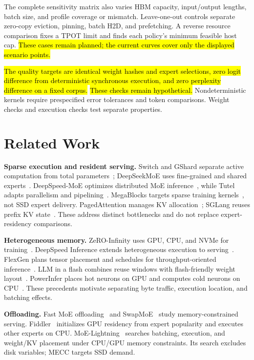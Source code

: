 \documentclass[conference,9pt,letterpaper]{IEEEtran}
\newcommand{\draftnote}[1]{{\sethlcolor{DraftYellow}\hl{#1}}}
\newcommand{\mecc}{\textsc{MECC}}
\begin{document}
The complete sensitivity matrix also varies HBM capacity, input/output lengths, batch size, and profile coverage or mismatch. Leave-one-out controls separate zero-copy eviction, pinning, batch H2D, and prefetching. A reverse resource comparison fixes a TPOT limit and finds each policy's minimum feasible host cap. \draftnote{These cases remain planned; the current curves cover only the displayed scenario points.}

\draftnote{The quality targets are identical weight hashes and expert selections, zero logit difference from deterministic synchronous execution, and zero perplexity difference on a fixed corpus.} \draftnote{These checks remain hypothetical.} Nondeterministic kernels require prespecified error tolerances and token comparisons. Weight checks and execution checks test separate properties.

\balance
\section{Related Work}
\textbf{Sparse execution and resident serving.} Switch and GShard separate active computation from total parameters~\cite{switch,gshard}; DeepSeekMoE uses fine-grained and shared experts~\cite{deepseekmoe}. DeepSpeed-MoE optimizes distributed MoE inference~\cite{deepspeedmoe}, while Tutel adapts parallelism and pipelining~\cite{tutel}. MegaBlocks targets sparse training kernels~\cite{megablocks}, not SSD expert delivery. PagedAttention manages KV allocation~\cite{pagedattention}; SGLang reuses prefix KV state~\cite{sglang}. These address distinct bottlenecks and do not replace expert-residency comparisons.

\textbf{Heterogeneous memory.} ZeRO-Infinity uses GPU, CPU, and NVMe for training~\cite{zeroinfinity}. DeepSpeed Inference extends heterogeneous execution to serving~\cite{dsinference}. FlexGen plans tensor placement and schedules for throughput-oriented inference~\cite{flexgen}. LLM in a flash combines reuse windows with flash-friendly weight layout~\cite{llmflash}. PowerInfer places hot neurons on GPU and computes cold neurons on CPU~\cite{powerinfer}. These precedents motivate separating byte traffic, execution location, and batching effects.

\textbf{Offloading.} Fast MoE offloading~\cite{offloading} and SwapMoE~\cite{swapmoe} study memory-constrained serving. Fiddler~\cite{fiddler} initializes GPU residency from expert popularity and executes other experts on CPU. MoE-Lightning~\cite{lightning} searches batching, execution, and weight/KV placement under CPU/GPU memory constraints. Its search excludes disk variables; \mecc{} targets SSD demand.
\end{document}
